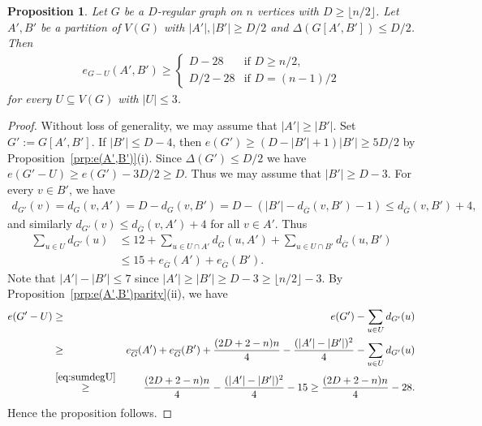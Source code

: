\documentclass{memo-l}
\newtheorem{prop}[firstthm]{Proposition}
\def\COMMENT#1{}
\numberwithin{section}{chapter}
\numberwithin{equation}{section}
\numberwithin{firstthm}{section}
\numberwithin{figure}{section}
\begin{document}
\begin{prop}  \label{prp:e(A',B')2}
Let $G$ be a $D$-regular graph on $n$ vertices with $D \ge \lfloor n/2 \rfloor$.
Let $A',B'$ be a partition of $V(G)$ with $|A'| , |B'| \ge D/2$ and $\Delta(G[A',B']) \le D/2$.
Then 
\begin{align}
e_{G - U}(A',B') \ge 
\begin{cases}
D - 28 & \textrm{if $D \ge n/2$,}\\
D/2 - 28 & \textrm{if $D = (n-1)/2$}
\end{cases}
\nonumber
\end{align}
for every $U \subseteq V(G)$ with $|U| \le 3$.
\end{prop}
\begin{proof}
Without loss of generality, we may assume that $|A'|\ge |B'|$.
Set  $G' := G[A',B']$.
If $|B'| \le D-4$, then $e(G') \ge (D - |B'|+1) |B'| \ge 5D/2$ by Proposition~\ref{prp:e(A',B')}(i).
Since $\Delta(G') \le D/2$ we have $e(G'- U) \ge e(G')  - 3 D/2 \ge D$.
Thus we may assume that $|B'| \ge D-3$. For every $v \in B'$, we have
\begin{align*}
d_{G'}(v) = d_G(v,A')  = D - d_G(v,B')
	= D - (|B'| - d_{\overline{G}}(v,B') - 1)
	\le  d_{\overline{G}}(v,B') + 4,
\end{align*}
and similarly $d_{G'}(v) \le d_{\overline{G}}(v,A') + 4$ for all $v \in A'$.
Thus
\begin{align}\label{eq:sumdegU}
\sum_{u \in U} d_{G'}(u) & \le  12+\sum_{u \in U \cap A'} d_{\overline{G}}(u,A') + \sum_{u \in U \cap B'} d_{\overline{G}}(u,B') \nonumber\\
& \le 15 + e_{\overline{G}}(A') + e_{\overline{G}}(B').
\end{align}
Note that $|A'| - |B'| \le 7$ since $|A'|\geq |B'| \geq D-3\ge \lfloor n/2\rfloor -3$.
By Proposition~\ref{prp:e(A',B')parity}(ii), we have 
\begin{eqnarray*}
	e(G' - U) & \ge & e(G') - \sum_{u \in U} d_{G'}(u) \\
	& \ge & e_{\overline{G}}(A') +e_{\overline{G}}(B') + \frac{(2D+2-n)n}{4} - \frac{(|A'|-|B'|)^2}4 - \sum_{u \in U} d_{G'}(u)\\
	& \stackrel{\eqref{eq:sumdegU}}{\ge} & \frac{(2D+2-n)n}{4} - \frac{(|A'|-|B'|)^2}4 - 15
	\ge \frac{(2D+2-n)n}{4} - 28.
\end{eqnarray*}
Hence the proposition follows.%
   \COMMENT{$\frac{(2D+2-n)n}{4}\ge D$ if $D\ge n/2$. So assume that $D=(n-1)/2$. We need to check that $\frac{(2D+2-n)n}{4}\ge D/2$.
But this holds iff $(2D+2-n)n\ge 2D$ iff $(n-1)2D\ge n(n-2)$ iff $D\ge \frac{n(n-2)}{2(n-1)}=\frac{n}{2}-\frac{n}{2(n-1)}$. So it holds
if $D=(n-1)/2$ since $\frac{n}{2(n-1)}\ge 1/2$.}
\end{proof}
\end{document}
